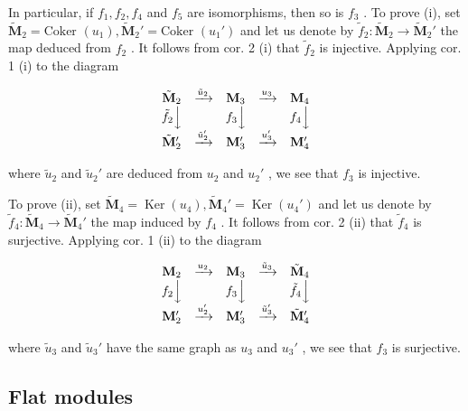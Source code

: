 In particular, if \(f_1, f_2, f_4\) and \(f_5\) are isomorphisms, then so is \(f_3\) . To prove (i), set \(\tilde{\mathbf{M}}_2 = \text{Coker } (u_1), \tilde{\mathbf{M}}_2' = \text{Coker } (u_1')\) and let us denote by \(\tilde{f}_2: \tilde{\mathbf{M}}_2 \to \tilde{\mathbf{M}}_2'\) the map deduced from \(f_2\) . It follows from cor. 2 (i) that \(\tilde{f}_2\) is injective. Applying cor. 1 (i) to the diagram

\[
\begin{array}{c c c c c} \tilde {\mathbf {M}} _ {2} & \xrightarrow {\tilde {u} _ {2}} & \mathbf {M} _ {3} & \xrightarrow {u _ {3}} & \mathbf {M} _ {4} \\ \tilde {f} _ {2} \Big \downarrow & & f _ {3} \Big \downarrow & & f _ {4} \Big \downarrow \\ \tilde {\mathbf {M}} _ {2} ^ {\prime} & \xrightarrow {\tilde {u} _ {2} ^ {\prime}} & \mathbf {M} _ {3} ^ {\prime} & \xrightarrow {u _ {3} ^ {\prime}} & \mathbf {M} _ {4} ^ {\prime} \end{array}
\]

where \(\tilde{u}_2\) and \(\tilde{u}_2'\) are deduced from \(u_2\) and \(u_2'\) , we see that \(f_3\) is injective.

To prove (ii), set \(\tilde{\mathbf{M}}_{4} = \operatorname{Ker}(u_{4}), \tilde{\mathbf{M}}_{4}' = \operatorname{Ker}(u_{4}')\) and let us denote by \(\tilde{f}_{4}: \tilde{\mathbf{M}}_{4} \to \tilde{\mathbf{M}}_{4}'\) the map induced by \(f_{4}\) . It follows from cor. 2 (ii) that \(\tilde{f}_{4}\) is surjective. Applying cor. 1 (ii) to the diagram

\[
\begin{array}{c c c c c} \mathbf {M} _ {2} & \xrightarrow {u _ {2}} & \mathbf {M} _ {3} & \xrightarrow {\tilde {u} _ {3}} & \tilde {\mathbf {M}} _ {4} \\ f _ {2} \Big \downarrow & & f _ {3} \Big \downarrow & & \tilde {f} _ {4} \Big \downarrow \\ \mathbf {M} _ {2} ^ {\prime} & \xrightarrow {u _ {2} ^ {\prime}} & \mathbf {M} _ {3} ^ {\prime} & \xrightarrow {\tilde {u} _ {3} ^ {\prime}} & \tilde {\mathbf {M}} _ {4} ^ {\prime} \end{array}
\]

where \(\tilde{u}_3\) and \(\tilde{u}_3'\) have the same graph as \(u_3\) and \(u_3'\) , we see that \(f_3\) is surjective.

\subsection{Flat modules}

